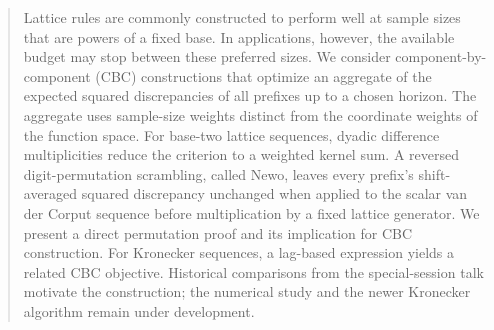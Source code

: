 \begin{abstract}
Lattice rules are commonly constructed to perform well at sample sizes that
are powers of a fixed base. In applications, however, the available budget
may stop between these preferred sizes. We consider component-by-component
(CBC) constructions that optimize an aggregate of the expected squared
discrepancies of all prefixes up to a chosen horizon. The aggregate uses
sample-size weights distinct from the coordinate weights of the function
space. For base-two lattice sequences, dyadic difference multiplicities
reduce the criterion to a weighted kernel sum. A reversed digit-permutation
scrambling, called Newo, leaves every prefix's shift-averaged squared
discrepancy unchanged when applied to the scalar van der Corput sequence
before multiplication by a fixed lattice generator. We present a direct
permutation proof and its implication for CBC construction. For Kronecker
sequences, a lag-based expression yields a related CBC objective. Historical
comparisons from the special-session talk motivate the construction; the
numerical study and the newer Kronecker algorithm remain under development.
\end{abstract}

\par\smallskip
\noindent{}
\par\smallskip
